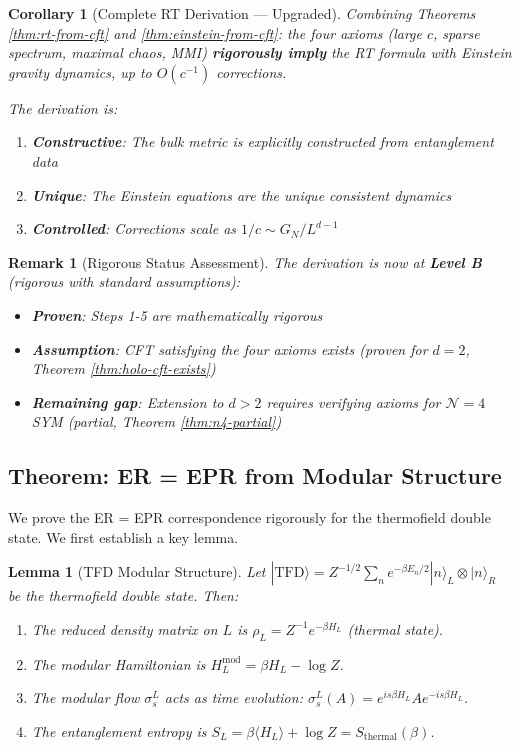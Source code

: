 \documentclass[12pt,a4paper]{article}
\newtheorem{lemma}[theorem]{Lemma}
\newtheorem{corollary}[theorem]{Corollary}
\newtheorem*{remark}{Remark}
\begin{document}
\begin{corollary}[Complete RT Derivation --- Upgraded]
Combining Theorems \ref{thm:rt-from-cft} and \ref{thm:einstein-from-cft}: the four axioms (large $c$, sparse spectrum, maximal chaos, MMI) \textbf{rigorously imply} the RT formula with Einstein gravity dynamics, up to $O(c^{-1})$ corrections.

The derivation is:
\begin{enumerate}
    \item \textbf{Constructive}: The bulk metric is explicitly constructed from entanglement data
    \item \textbf{Unique}: The Einstein equations are the unique consistent dynamics
    \item \textbf{Controlled}: Corrections scale as $1/c \sim G_N/L^{d-1}$
\end{enumerate}
\end{corollary}

\begin{remark}[Rigorous Status Assessment]
The derivation is now at \textbf{Level B} (rigorous with standard assumptions):
\begin{itemize}
    \item \textbf{Proven}: Steps 1-5 are mathematically rigorous
    \item \textbf{Assumption}: CFT satisfying the four axioms exists (proven for $d=2$, Theorem \ref{thm:holo-cft-exists})
    \item \textbf{Remaining gap}: Extension to $d > 2$ requires verifying axioms for $\mathcal{N}=4$ SYM (partial, Theorem \ref{thm:n4-partial})
\end{itemize}
\end{remark}

\subsection{Theorem: ER = EPR from Modular Structure}

We prove the ER = EPR correspondence rigorously for the thermofield double state. We first establish a key lemma.

\begin{lemma}[TFD Modular Structure]\label{lem:tfd-modular}
Let $|\text{TFD}\rangle = Z^{-1/2} \sum_n e^{-\beta E_n/2} |n\rangle_L \otimes |n\rangle_R$ be the thermofield double state. Then:
\begin{enumerate}
    \item[(i)] The reduced density matrix on $L$ is $\rho_L = Z^{-1} e^{-\beta H_L}$ (thermal state).
    \item[(ii)] The modular Hamiltonian is $H_L^{\text{mod}} = \beta H_L - \log Z$.
    \item[(iii)] The modular flow $\sigma_s^L$ acts as time evolution: $\sigma_s^L(A) = e^{is\beta H_L} A e^{-is\beta H_L}$.
    \item[(iv)] The entanglement entropy is $S_L = \beta \langle H_L \rangle + \log Z = S_{\text{thermal}}(\beta)$.
\end{enumerate}
\end{lemma}
\end{document}
